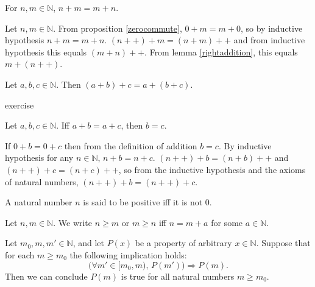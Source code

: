 \documentclass{article}
\begin{document}
\begin{proposition}
	For \(n,m\in\mathbb{N}\), \(n+m=m+n\).
	\begin{IEEEproof}
		Let \(n,m\in\mathbb{N}\). From proposition \ref{zerocommute}, \(0+m=m+0\), so by inductive hypothesis \(n+m=m+n\). \((n++)+m=(n+m)++\) and from inductive hypothesis this equals \((m+n)++\). From lemma \ref{rightaddition}, this equals \(m+(n++)\).
	\end{IEEEproof}
\end{proposition}
\begin{proposition}
	Let \(a,b,c\in\mathbb{N}\). Then \((a+b)+c=a+(b+c)\).
	\begin{IEEEproof}
		exercise
	\end{IEEEproof}
\end{proposition}
\begin{proposition}
	Let \(a,b,c\in\mathbb{N}\). Iff \(a+b=a+c\), then \(b=c\).
	\begin{IEEEproof}
		If \(0+b=0+c\) then from the definition of addition \(b=c\). By inductive hypothesis for any \(n\in\mathbb{N}\), \(n+b=n+c\). \((n++)+b=(n+b)++\) and \((n++)+c=(n+c)++\), so from the inductive hypothesis and the axioms of natural numbers, \((n++)+b=(n++)+c\).
	\end{IEEEproof}
\end{proposition}
\begin{definition}
	A natural number \(n\) is said to be positive iff it is not \(0\).
\end{definition}
\begin{definition}
	Let \(n,m\in\mathbb{N}\). We write \(n\geq m\) or \(m\geq n\) iff \(n=m+a\) for some \(a\in\mathbb{N}\).
\end{definition}
\begin{proposition}
	Let \(m_0,m,m'\in\mathbb{N}\), and let \(P(x)\) be a property of arbitrary \(x\in\mathbb{N}\). Suppose that for each \(m\geq m_0\) the following implication holds:
	\begin{equation*}
		\bigg(\forall m'\in[m_0,m),\,P(m')\bigg)\Rightarrow P(m).
	\end{equation*}
	Then we can conclude \(P(m)\) is true for all natural numbers \(m\geq m_0\).
\end{proposition}
\end{document}
